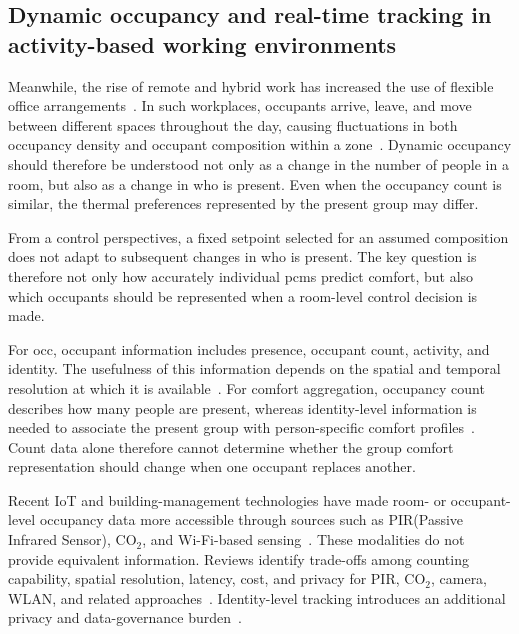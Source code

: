 \subsection{Dynamic occupancy and real-time tracking in activity-based working environments}
Meanwhile, the rise of remote and hybrid work has increased the use of flexible office arrangements~\cite{marzban_review_2023}.
In such workplaces, occupants arrive, leave, and move between different spaces throughout the day, causing fluctuations in both occupancy density and occupant composition within a zone~\cite{motuziene_office_2022}\cite{pan_environmental_2025}\cite{huang_space-matching_2025}.
Dynamic occupancy should therefore be understood not only as a change in the number of people in a room, but also as a change in who is present.
Even when the occupancy count is similar, the thermal preferences represented by the present group may differ.

From a control perspectives, a fixed setpoint selected for an assumed composition does not adapt to subsequent changes in who is present.
The key question is therefore not only how accurately individual \acp{pcm} predict comfort, but also which occupants should be represented when a room-level control decision is made.

For \ac{occ}, occupant information includes presence, occupant count, activity, and identity.
The usefulness of this information depends on the spatial and temporal resolution at which it is available~\cite{nagy_ten_2023}.
For comfort aggregation, occupancy count describes how many people are present, whereas identity-level information is needed to associate the present group with person-specific comfort profiles~\cite{nagy_ten_2023}.
Count data alone therefore cannot determine whether the group comfort representation should change when one occupant replaces another.

Recent IoT and building-management technologies have made room- or occupant-level occupancy data more accessible through sources such as PIR(Passive Infrared Sensor), CO$_2$, and Wi-Fi-based sensing~\cite{soleimanijavid_challenges_2024}\cite{zafari_survey_2019}\cite{brambilla_potential_2021}.
These modalities do not provide equivalent information.
Reviews identify trade-offs among counting capability, spatial resolution, latency, cost, and privacy for PIR, CO$_2$, camera, WLAN, and related approaches~\cite{yang_review_2016}\cite{zafari_survey_2019}\cite{brambilla_potential_2021}.
Identity-level tracking introduces an additional privacy and data-governance burden~\cite{obrien_key_2020}\cite{nagy_ten_2023}.

